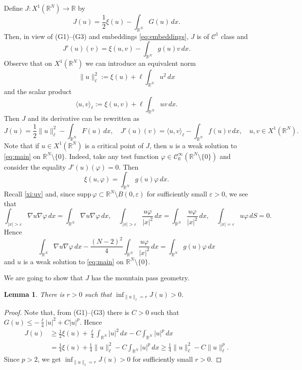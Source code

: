 \documentclass[12pt,leqno,twoside,sort]{amsart}
\newtheorem{Lem}[Th]{Lemma}
\newcommand{\R}{\mathbb{R}}
\newcommand{\cC}{{\mathcal C}}
\numberwithin{equation}{section}
\newcommand{\supp}{\mathrm{supp}\,}
\begin{document}
Define $J : X^1 (\R^N) \rightarrow \R$ by
$$
J(u) = \frac12 \xi(u) - \int_{\R^N} G(u) \, dx.
$$
Then, in view of (G1)--(G3) and embeddings \eqref{eq:embeddings}, $J$ is of $\cC^1$ class and
$$
J'(u)(v) = \xi(u,v) - \int_{\R^N} g(u) v \, dx.
$$
Observe that on $X^1 (\R^N)$ we can introduce an equivalent norm
$$
\|u\|_\ell^2 := \xi(u) + \ell \int_{\R^N} u^2 \, dx
$$
and the scalar product
$$
\langle u, v \rangle_\ell := \xi(u,v) + \ell \int_{\R^N} uv \, dx.
$$
Then $J$ and its derivative can be rewritten as
$$
J(u) = \frac12 \|u\|_\ell^2 - \int_{\R^N} F(u) \, dx, \quad J'(u)(v) = \langle u,v\rangle_\ell - \int_{\R^N} f(u) v \, dx, \quad u,v \in X^1 (\R^N).
$$
Note that if $u \in X^1 (\R^N)$ is a critical point of $J$, then $u$ is a weak solution to \eqref{eq:main} on $\R^N \setminus \{0\}$. Indeed, take any test function $\varphi \in \cC_0^\infty (\R^N \setminus \{0\})$ and consider the equality $J'(u)(\varphi) = 0$. Then
$$
\xi(u, \varphi) = \int_{\R^N} g(u) \varphi \, dx.
$$
Recall \eqref{xi:uv} and, since $\supp \varphi \subset \R^N \setminus B(0,\varepsilon)$ for sufficiently small $\varepsilon > 0$, we see that
$$
\int_{|x| > \varepsilon} \nabla u \nabla \varphi \, dx = \int_{\R^N} \nabla u \nabla \varphi \, dx, \quad \int_{|x| > \varepsilon} \frac{u \varphi}{|x|^2} \, dx = \int_{\R^N} \frac{u \varphi}{|x|^2} \, dx, \quad \int_{|x|=\varepsilon} u \varphi \, dS = 0.
$$
Hence
$$
\int_{\R^N} \nabla u \nabla \varphi \, dx - \frac{(N-2)^2}{4} \int_{\R^N} \frac{u \varphi}{|x|^2} \, dx = \int_{\R^N} g(u) \varphi \, dx
$$
and $u$ is a weak solution to \eqref{eq:main} on $\R^N \setminus \{0\}$.

We are going to show that $J$ has the mountain pass geometry.

\begin{Lem}\label{r}
There is $r > 0$ such that $\inf_{\|u\|_\ell =r} J(u) > 0$. 
\end{Lem}

\begin{proof}
Note that, from (G1)--(G3) there is $C > 0$ such that $G(u) \leq - \frac{\ell}{4} |u|^2 + C |u|^{p}$. Hence
\begin{align*}
J(u) &\geq \frac12 \xi(u) + \frac{\ell}{4} \int_{\R^N} |u|^2 \, dx - C \int_{\R^N} |u|^{p} \, dx \\
&= \frac 14 \xi(u)+\frac{1}{4} \|u\|_\ell^2 - C \int_{\R^N} |u|^{p} \, dx \geq \frac{1}{4} \|u\|_\ell^2 - C \|u\|_\ell^p.
\end{align*}
Since $p > 2$, we get $\inf_{\|u\|_\ell =r} J(u) > 0$ for sufficiently small $r > 0$.
\end{proof}
\end{document}
